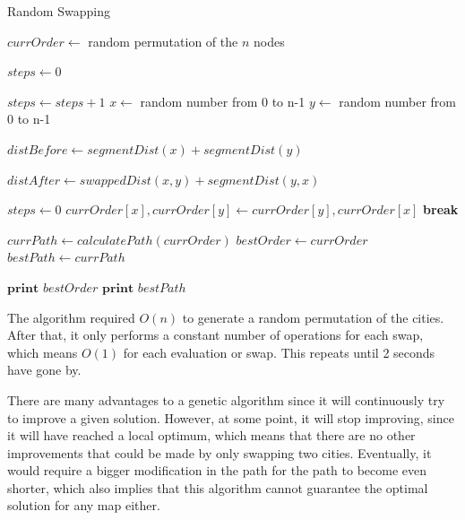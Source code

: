 \documentclass{article}
\begin{document}
\begin{algorithm}[H]
\caption{Random Swapping}
\begin{algorithmic}

    \State $currOrder \gets $ random permutation of the $n$ nodes

    \State $steps \gets 0$ \Comment{\textcolor{blue}{keeps track of the number of times cities have been compared without any improvements}}

        \State $steps \gets steps + 1$
        \State $x \gets $ random number from 0 to n-1 \Comment{\textcolor{blue}{index of a random city in $currOrder$}}
        \State $y \gets $ random number from 0 to n-1

        \State $distBefore \gets segmentDist(x) + segmentDist(y)$ \Comment{\textcolor{blue}{$segmentDist(x)$  returns the distance from the city in $currOrder$ before $x$ to $x$ + distance from $x$ to the city in $currOrder$ after $x$}}

        \State $distAfter \gets swappedDist(x,y) + segmentDist(y,x)$ \Comment{\textcolor{blue}{$swappedDist(x,y)$  returns the distance from the city in $currOrder$ before $x$ to $y$ + distance from $y$ to the city in $currOrder$ after $x$}}

            \State $steps \gets 0$
            \State $currOrder[x],currOrder[y] \gets currOrder[y],currOrder[x]$ \Comment{\textcolor{blue}{swap index $x$ and $y$}}
            \State \textbf{break}
        \EndIf
    \EndWhile

    \State $currPath \gets calculatePath(currOrder)$
        \State $bestOrder \gets currOrder$
        \State $bestPath \gets currPath$
    \EndIf
\EndWhile

\State $\textbf{print } bestOrder $
\State $\textbf{print } bestPath $

\end{algorithmic}
\end{algorithm}

\noindent
The algorithm required $O(n)$ to generate a random permutation of the cities. After that, it only performs a constant number of operations for each swap, which means $O(1)$ for each evaluation or swap. This repeats until 2 seconds have gone by.

\noindent
There are many advantages to a genetic algorithm since it will continuously try to improve a given solution. However, at some point, it will stop improving, since it will have reached a local optimum, which means that there are no other improvements that could be made by only swapping two cities. Eventually, it would require a bigger modification in the path for the path to become even shorter, which also implies that this algorithm cannot guarantee the optimal solution for any map either. \cite{YANG202191}
\end{document}
